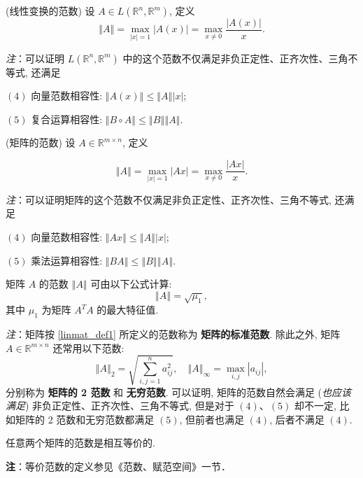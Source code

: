 \begin{definition}{(线性变换的范数)}
设 $A\in L(\mathbb{R}^{n},\mathbb{R}^{m})$, 定义
\[
\left\Vert A\right\Vert =\max_{|x|=1}|A(x)|=\max_{x\neq0}{\displaystyle \frac{|A(x)|}{x}}.
\]
\end{definition}
\textsl{注}：可以证明 $L(\mathbb{R}^{n},\mathbb{R}^{m})$ 中的这个范数不仅满足非负正定性、正齐次性、三角不等式,
还满足

$(4)$ 向量范数相容性: $\left\Vert A(x)\right\Vert \leqslant\left\Vert A\right\Vert \left|x\right|$;

$(5)$ 复合运算相容性: $\left\Vert B\circ A\right\Vert \leqslant\left\Vert B\right\Vert \left\Vert A\right\Vert $.



\begin{definition}{(矩阵的范数)}\label{linmat_def1}
设 $A\in\mathbb{R}^{m\times n}$, 定义

\[
\left\Vert A\right\Vert =\max_{|x|=1}|Ax|=\max_{x\neq0}{\displaystyle \frac{|Ax|}{x}}.
\]

\end{definition}
\textsl{注}：可以证明矩阵的这个范数不仅满足非负正定性、正齐次性、三角不等式, 还满足

$(4)$ 向量范数相容性: $\left\Vert Ax\right\Vert \leqslant\left\Vert A\right\Vert \left|x\right|$;

$(5)$ 乘法运算相容性: $\left\Vert BA\right\Vert \leqslant\left\Vert B\right\Vert \left\Vert A\right\Vert $.



\begin{theorem}{}
矩阵 $A$ 的范数 $\left\Vert A\right\Vert $ 可由以下公式计算: 
\[
\left\Vert A\right\Vert =\sqrt{\mu_{1}},
\]
 其中 $\mu_{1}$ 为矩阵 $A^{T}A$ 的最大特征值. 
\end{theorem}

\textsl{注}：矩阵按 \autoref{linmat_def1} 所定义的范数称为 \textbf{矩阵的标准范数}. 除此之外, 矩阵 $A\in\mathbb{R}^{m\times n}$ 还常用以下范数:
\[
\left\Vert A\right\Vert _{2}=\sqrt{\sum_{i,j=1}^{n}a_{ij}^{2}},\quad\left\Vert A\right\Vert _{\infty}=\max_{i,j}|a_{ij}|,
\]
分别称为 \textbf{矩阵的 2 范数} 和 \textbf{无穷范数}. 可以证明, 矩阵的范数自然会满足 (\textsl{也应该满足}) 非负正定性、正齐次性、三角不等式, 但是对于 $(4)$、$(5)$
却不一定, 比如矩阵的 2 范数和无穷范数都满足 $(5)$, 但前者也满足 $(4)$, 后者不满足 $(4)$. 



\begin{theorem}{}
任意两个矩阵的范数是相互等价的. 

\textbf{注}：等价范数的定义参见《范数、赋范空间》一节．
\end{theorem}
\verb| |

